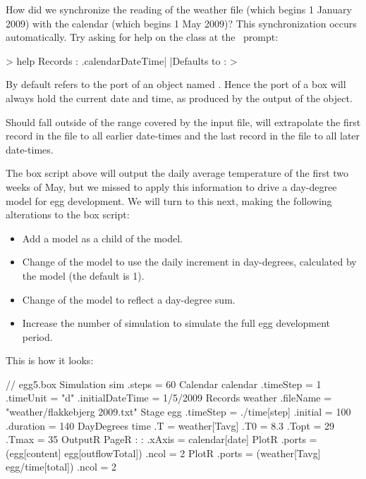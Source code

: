 How did we synchronize the reading of the weather file (which begins 1 January 2009) with the calendar (which begins 1 May 2009)? This synchronization occurs automatically. Try asking for help on the  class at the \US\ prompt:

\begin{usdialog}
> help Records
:
.calendarDateTime| |Defaults to %
:
>
\end{usdialog}

By default  refers to the  port of an object named . Hence the  port of a  box will always hold the current date and time, as produced by the  output of the  object.

Should  fall outside of the range covered by the input file,  will extrapolate the first record in the file to all earlier date-times and the last record in the file to all later date-times.

The box script above will output the daily average temperature of the first two weeks of May, but we missed to apply this information to drive a day-degree model for egg development. We will turn to this next, making the following alterations to the box script:
\begin{itemize}
\item Add a  model as a child of the  model.
\item Change  of the  model to use the daily increment in day-degrees, calculated by the  model (the default  is 1).
\item Change  of the  model to reflect a day-degree sum.
\item Increase the number of simulation  to simulate the full egg development period.
\end{itemize}
This is how it looks:

\lstset{numbers=left}
\begin{boxscript}[label=egg05-box]
// egg5.box
Simulation sim {
  .steps = 60
  Calendar calendar {
    .timeStep = 1
    .timeUnit = "d"
    .initialDateTime = 1/5/2009
  }
  Records weather {
    .fileName = "weather/flakkebjerg 2009.txt"
  }
  Stage egg {
    .timeStep = ./time[step]
    .initial = 100 
    .duration = 140
    DayDegrees time {
      .T = weather[Tavg]
      .T0 = 8.3
      .Topt = 29
      .Tmax = 35
    }
  }
  OutputR {
    PageR {
:
:
      .xAxis = calendar[date]
      PlotR {
        .ports = (egg[content] egg[outflowTotal])   
        .ncol = 2
      }
      PlotR {
        .ports = (weather[Tavg] egg/time[total])   
        .ncol = 2
      }
    }
  }
}\end{boxscript}
\lstset{numbers=none}

